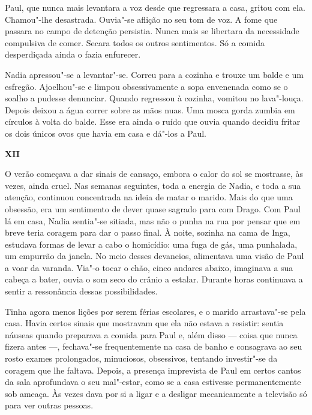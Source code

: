 Paul, que nunca mais levantara a voz desde que regressara a casa,
gritou com ela. Chamou"-lhe desastrada. Ouvia"-se aflição no seu tom de voz. A fome que passara no campo de detenção
persistia. Nunca mais se libertara da necessidade compulsiva de comer.
Secara todos os outros sentimentos. Só a comida desperdiçada ainda o
fazia enfurecer.

Nadia apressou"-se a levantar"-se. Correu para a cozinha e trouxe um balde
e um esfregão. Ajoelhou"-se e limpou obsessivamente a sopa envenenada
como se o soalho a pudesse denunciar. Quando regressou à cozinha,
vomitou no lava"-louça. Depois deixou a água correr sobre as mãos nuas.
Uma mosca gorda zumbia em círculos à volta do balde. Esse era ainda o
ruído que ouvia quando decidiu fritar os dois únicos ovos que havia em
casa e dá"-los a Paul.

\pagebreak
\movetooddpage
\vspace*{1.8cm}
\noindent{}\textbf{XII}

\bigskip

\noindent{}O verão começava a dar sinais de cansaço, embora o calor do sol se
mostrasse, às vezes, ainda cruel. Nas semanas seguintes, toda a
energia de Nadia, e toda a sua atenção, continuou concentrada na ideia
de matar o marido. Mais do que uma obsessão, era um sentimento de dever
quase sagrado para com Drago. Com Paul lá em casa, Nadia sentia"-se
sitiada, mas não o punha na rua por pensar que em breve teria coragem
para dar o passo final. À noite, sozinha na cama de Inga, estudava
formas de levar a cabo o homicídio: uma fuga de gás, uma punhalada, um
empurrão da janela. No meio desses devaneios, alimentava uma visão de
Paul a voar da varanda. Via"-o tocar o chão, cinco andares abaixo,
imaginava a sua cabeça a bater, ouvia o som seco do crânio a estalar.
Durante horas continuava a sentir a ressonância dessas possibilidades.

Tinha agora menos lições por serem férias escolares, e
o marido arrastava"-se pela casa. Havia certos sinais que mostravam que
ela não estava a resistir: sentia náuseas quando preparava a comida para
Paul e, além disso --- coisa que nunca fizera antes ---, fechava"-se
frequentemente na
casa de banho e consagrava ao seu rosto exames prolongados,
minuciosos, obsessivos, tentando investir"-se da coragem que lhe faltava.
Depois, a presença imprevista de Paul em certos cantos da sala
aprofundava o seu mal"-estar, como se a casa estivesse permanentemente
sob ameaça. Às vezes dava por si a ligar e a desligar mecanicamente a
televisão só para ver outras pessoas.

